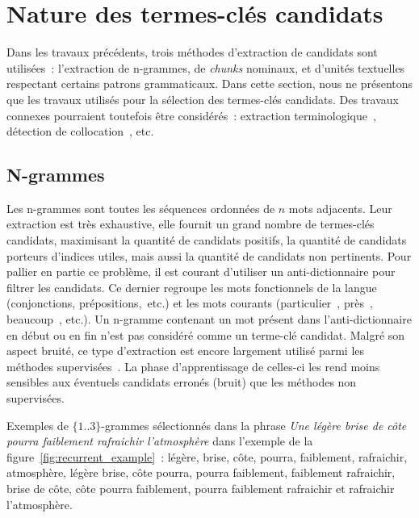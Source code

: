     \section{Nature des termes-clés candidats }
    \label{sec:main-state_of_the_art-keyphrase_candidate_selection-keyphrase_candidate_nature}
      Dans les travaux précédents, trois méthodes d'extraction de candidats sont
      utilisées~: l'extraction de n-grammes, de \textit{chunks} nominaux, et
      d'unités textuelles respectant certains patrons grammaticaux. Dans cette
      section, nous ne présentons que les travaux utilisés pour la sélection des
      termes-clés candidats. Des travaux connexes pourraient toutefois être
      considérés~: extraction
      terminologique~\cite{castellvi2001automatictermdetection}, détection de
      collocation~\cite{pearce2002collocationdetection}, etc.

      \subsection{N-grammes}
      \label{subsec:main-state_of_the_art-automatic_keyphrase_extraction-automatic_keyphrase_extraction-n_grams}
        Les n-grammes sont toutes les séquences ordonnées de $n$ mots adjacents.
        Leur extraction est très exhaustive, elle fournit un grand nombre de
        termes-clés candidats, maximisant la quantité de candidats positifs, la
        quantité de candidats porteurs d'indices utiles, mais aussi la quantité
        de candidats non pertinents. Pour pallier en partie ce problème, il est
        courant d'utiliser un anti-dictionnaire pour filtrer les candidats. Ce
        dernier regroupe les mots fonctionnels de la langue (conjonctions,
        prépositions,~etc.) et les mots courants (\og particulier~\fg, \og
        près~\fg, \og beaucoup~\fg, etc.). Un n-gramme contenant un mot présent
        dans l'anti-dictionnaire en début ou en fin n'est pas considéré comme un
        terme-clé candidat. Malgré son aspect bruité, ce type d'extraction est
        encore largement utilisé parmi les méthodes
        supervisées~\cite{witten1999kea,turney1999learningalgorithms,hulth2003keywordextraction}.
        La phase d'apprentissage de celles-ci les rend moins sensibles aux
        éventuels candidats erronés (bruit) que les méthodes non supervisées.

        Exemples de $\{1..3\}$-grammes sélectionnés dans la phrase
        \textit{\og{}Une légère brise de côte pourra faiblement rafraichir
        l'atmosphère\fg{}} dans l'exemple de la
        figure~\ref{fig:recurrent_example}~: \og{}légère\fg{}, \og{}brise\fg{},
        \og{}côte\fg{}, \og{}pourra\fg{}, \og{}faiblement\fg{},
        \og{}rafraichir\fg{}, \og{}atmosphère\fg{}, \og{}légère brise\fg{},
        \og{}côte pourra\fg{}, \og{}pourra faiblement\fg{}, \og{}faiblement
        rafraichir\fg{}, \og{}brise de côte\fg{}, \og{}côte pourra
        faiblement\fg{}, \og{}pourra faiblement rafraichir\fg{} et
        \og{}rafraichir l'atmosphère\fg{}.

